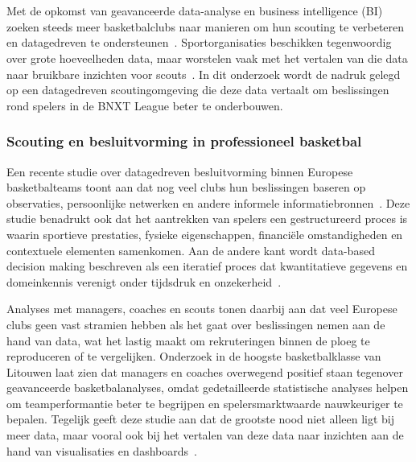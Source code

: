 \chapter{}%
\label{ch:stand-van-zaken}



Met de opkomst van geavanceerde data-analyse en business intelligence (BI) zoeken
steeds meer basketbalclubs naar manieren om hun scouting te verbeteren en
datagedreven te ondersteunen~\autocite{iglesiasdata}. Sportorganisaties beschikken
tegenwoordig over grote hoeveelheden data, maar worstelen vaak met het vertalen
van die data naar bruikbare inzichten voor scouts~\autocite{demenius2017benefits}.
In dit onderzoek wordt de nadruk gelegd op een datagedreven scoutingomgeving die
deze data vertaalt om beslissingen rond spelers in de BNXT League beter te
onderbouwen.

\subsection{Scouting en besluitvorming in professioneel basketbal}%
\label{subsec:scouting-besluitvorming}

Een recente studie over datagedreven besluitvorming binnen Europese basketbalteams
toont aan dat nog veel clubs hun beslissingen baseren op observaties, persoonlijke
netwerken en andere informele informatiebronnen~\autocite{iglesiasdata}. Deze studie
benadrukt ook dat het aantrekken van spelers een gestructureerd proces is waarin
sportieve prestaties, fysieke eigenschappen, financiële omstandigheden en
contextuele elementen samenkomen. Aan de andere kant wordt data-based decision
making beschreven als een iteratief proces dat kwantitatieve gegevens en
domeinkennis verenigt onder tijdsdruk en onzekerheid~\autocite{iglesiasdata}.

Analyses met managers, coaches en scouts tonen daarbij aan dat veel Europese clubs
geen vast stramien hebben als het gaat over beslissingen nemen aan de hand van
data, wat het lastig maakt om rekruteringen binnen de ploeg te reproduceren of te
vergelijken. Onderzoek in de hoogste basketbalklasse van Litouwen laat zien dat
managers en coaches overwegend positief staan tegenover geavanceerde
basketbalanalyses, omdat gedetailleerde statistische analyses helpen om
teamperformantie beter te begrijpen en spelersmarktwaarde nauwkeuriger te bepalen.
Tegelijk geeft deze studie aan dat de grootste nood niet alleen ligt bij meer data,
maar vooral ook bij het vertalen van deze data naar inzichten aan de hand van
visualisaties en dashboards~\autocite{demenius2017benefits}.

